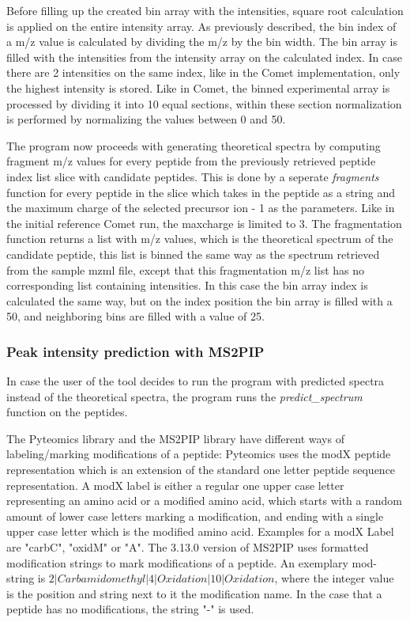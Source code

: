 \documentclass[11pt]{article}
\begin{document}
Before filling up the created bin array with the intensities, square root calculation is applied on the entire intensity array.
 As previously described, the bin index of a m/z value is calculated by dividing the m/z by the bin width. The bin array is filled with the intensities from the intensity array on the calculated index. In case there are 2 intensities on the same index, like in the Comet implementation, only the highest intensity is stored. Like in Comet, the binned experimental array is processed by dividing it into 10 equal sections, within these section normalization is performed by normalizing the values between 0 and 50.

The program now proceeds with generating theoretical spectra by computing fragment m/z values for every peptide from the previously retrieved peptide index list slice with candidate peptides. This is done by a seperate \textit{fragments} function for every peptide in the slice which takes in the peptide as a string and the maximum charge of the selected precursor ion - 1 as the parameters. Like in the initial reference Comet run, the maxcharge is limited to 3. The fragmentation function returns a list with m/z values, which is the theoretical spectrum of the candidate peptide, this list is binned the same way as the spectrum retrieved from the sample mzml file, except that this fragmentation m/z list has no corresponding list containing intensities. In this case the bin array index is calculated the same way, but on the index position the bin array is filled with a 50, and neighboring bins are filled with a value of 25. 

\subsubsection{Peak intensity prediction with MS2PIP}
In case the user of the tool decides to run the program with predicted spectra instead of the theoretical spectra, the program runs the \textit{predict\_spectrum} function on the peptides. 

The Pyteomics library and the MS2PIP library have different ways of labeling/marking modifications of a peptide: Pyteomics uses the modX peptide representation which is an extension of the standard one letter peptide sequence representation. A modX label is either a regular one upper case letter representing an amino acid or a modified amino acid, which starts with a random amount of lower case letters marking a modification, and ending with a single upper case letter which is the modified amino acid. Examples for a modX Label are "carbC", "oxidM" or "A". The 3.13.0 version of MS2PIP uses formatted modification strings to mark modifications of a peptide. An exemplary mod-string is \begin{math}2|Carbamidomethyl|4|Oxidation|10|Oxidation\end{math}, where the integer value is the position and string next to it the modification name. In the case that a peptide has no modifications, the string "-" is used. 
\end{document}
